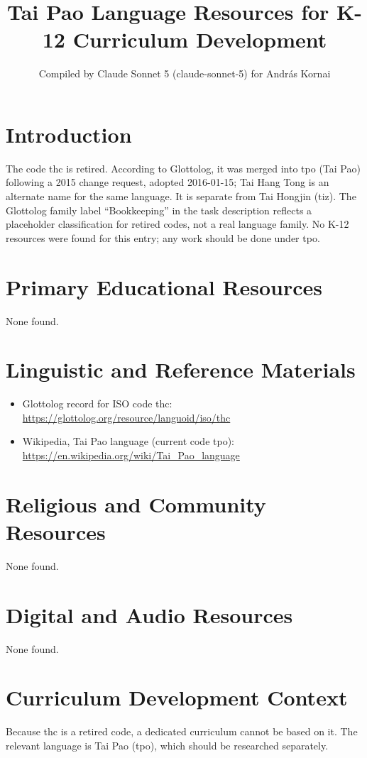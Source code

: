 \documentclass[12pt]{article}
\title{Tai Pao Language Resources for K-12 Curriculum Development}
\author{Compiled by Claude Sonnet 5 (claude-sonnet-5) for Andr\'as Kornai}
\date{}
\begin{document}
\maketitle
\section{Introduction}
The code thc is retired. According to Glottolog, it was merged into tpo (Tai Pao) following a 2015 change request, adopted 2016-01-15; Tai Hang Tong is an alternate name for the same language. It is separate from Tai Hongjin (tiz). The Glottolog family label ``Bookkeeping'' in the task description reflects a placeholder classification for retired codes, not a real language family. No K-12 resources were found for this entry; any work should be done under tpo.
\section{Primary Educational Resources}
None found.
\section{Linguistic and Reference Materials}
\begin{itemize}
\item Glottolog record for ISO code thc: \url{https://glottolog.org/resource/languoid/iso/thc}
\item Wikipedia, Tai Pao language (current code tpo): \url{https://en.wikipedia.org/wiki/Tai_Pao_language}
\end{itemize}
\section{Religious and Community Resources}
None found.
\section{Digital and Audio Resources}
None found.
\section{Curriculum Development Context}
Because thc is a retired code, a dedicated curriculum cannot be based on it. The relevant language is Tai Pao (tpo), which should be researched separately.
\end{document}

